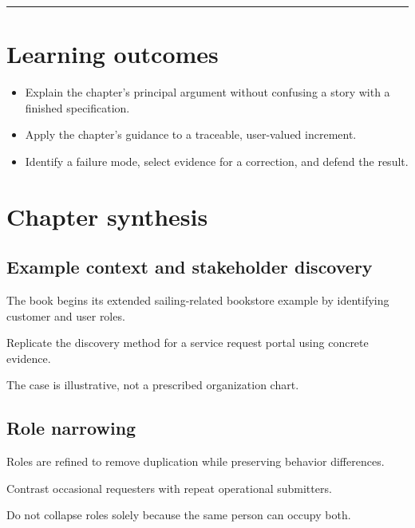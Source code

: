 \documentclass[11pt,letterpaper]{article}
\begin{document}
\tableofcontents\medskip\noindent\rule{\linewidth}{0.4pt}\medskip
\section{Learning outcomes}
\begin{itemize}[leftmargin=*,itemsep=2pt]
\item Explain the chapter's principal argument without confusing a story with a finished specification.
\item Apply the chapter's guidance to a traceable, user-valued increment.
\item Identify a failure mode, select evidence for a correction, and defend the result.
\end{itemize}
\section{Chapter synthesis}
\subsection{Example context and stakeholder discovery}
The book begins its extended sailing-related bookstore example by identifying customer and user roles.

\begin{tcolorbox}[colback=tealback,colframe=navy,title={Engineering translation},breakable]
Replicate the discovery method for a service request portal using concrete evidence.

\end{tcolorbox}
\begin{tcolorbox}[colback=amberback,colframe=navy,title={Failure mode to watch},breakable]
The case is illustrative, not a prescribed organization chart.

\end{tcolorbox}
\subsection{Role narrowing}
Roles are refined to remove duplication while preserving behavior differences.

\begin{tcolorbox}[colback=tealback,colframe=navy,title={Engineering translation},breakable]
Contrast occasional requesters with repeat operational submitters.

\end{tcolorbox}
\begin{tcolorbox}[colback=amberback,colframe=navy,title={Failure mode to watch},breakable]
Do not collapse roles solely because the same person can occupy both.

\end{tcolorbox}
\end{document}
